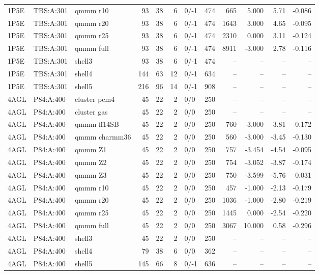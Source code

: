 \documentclass[journal=jcisd8,manuscript=suppinfo]{achemso}
\begin{document}
\begin{singlespace}
{\begin{longtable}{lllrrrlrrrrr}
1P5E & TBS:A:301 & qmmm r10 & 93 & 38 & 6 & 0/-1 & 474 & 665 & 5.000 & 5.71 & -0.086\\
1P5E & TBS:A:301 & qmmm r20 & 93 & 38 & 6 & 0/-1 & 474 & 1643 & 3.000 & 4.65 & -0.095\\
1P5E & TBS:A:301 & qmmm r25 & 93 & 38 & 6 & 0/-1 & 474 & 2310 & 0.000 & 3.11 & -0.124\\
1P5E & TBS:A:301 & qmmm full & 93 & 38 & 6 & 0/-1 & 474 & 8911 & -3.000 & 2.78 & -0.116\\
1P5E & TBS:A:301 & shell3 & 93 & 38 & 6 & 0/-1 & 474 & -- & -- & -- & --\\
1P5E & TBS:A:301 & shell4 & 144 & 63 & 12 & 0/-1 & 634 & -- & -- & -- & --\\
1P5E & TBS:A:301 & shell5 & 216 & 96 & 14 & 0/-1 & 908 & -- & -- & -- & --\\
4AGL & P84:A:400 & cluster pcm4 & 45 & 22 & 2 & 0/0 & 250 & -- & -- & -- & --\\
4AGL & P84:A:400 & cluster gas & 45 & 22 & 2 & 0/0 & 250 & -- & -- & -- & --\\
4AGL & P84:A:400 & qmmm ff14SB & 45 & 22 & 2 & 0/0 & 250 & 760 & -3.000 & -3.81 & -0.172\\
4AGL & P84:A:400 & qmmm charmm36 & 45 & 22 & 2 & 0/0 & 250 & 560 & -3.000 & -3.45 & -0.130\\
4AGL & P84:A:400 & qmmm Z1 & 45 & 22 & 2 & 0/0 & 250 & 757 & -3.454 & -4.54 & -0.095\\
4AGL & P84:A:400 & qmmm Z2 & 45 & 22 & 2 & 0/0 & 250 & 754 & -3.052 & -3.87 & -0.174\\
4AGL & P84:A:400 & qmmm Z3 & 45 & 22 & 2 & 0/0 & 250 & 750 & -3.599 & -5.76 & 0.031\\
4AGL & P84:A:400 & qmmm r10 & 45 & 22 & 2 & 0/0 & 250 & 457 & -1.000 & -2.13 & -0.179\\
4AGL & P84:A:400 & qmmm r20 & 45 & 22 & 2 & 0/0 & 250 & 1036 & -1.000 & -2.80 & -0.219\\
4AGL & P84:A:400 & qmmm r25 & 45 & 22 & 2 & 0/0 & 250 & 1445 & 0.000 & -2.54 & -0.220\\
4AGL & P84:A:400 & qmmm full & 45 & 22 & 2 & 0/0 & 250 & 3067 & 10.000 & 0.58 & -0.296\\
4AGL & P84:A:400 & shell3 & 45 & 22 & 2 & 0/0 & 250 & -- & -- & -- & --\\
4AGL & P84:A:400 & shell4 & 79 & 38 & 6 & 0/0 & 362 & -- & -- & -- & --\\
4AGL & P84:A:400 & shell5 & 145 & 66 & 8 & 0/-1 & 636 & -- & -- & -- & --\\

\end{longtable}}
\end{singlespace}
\end{document}
